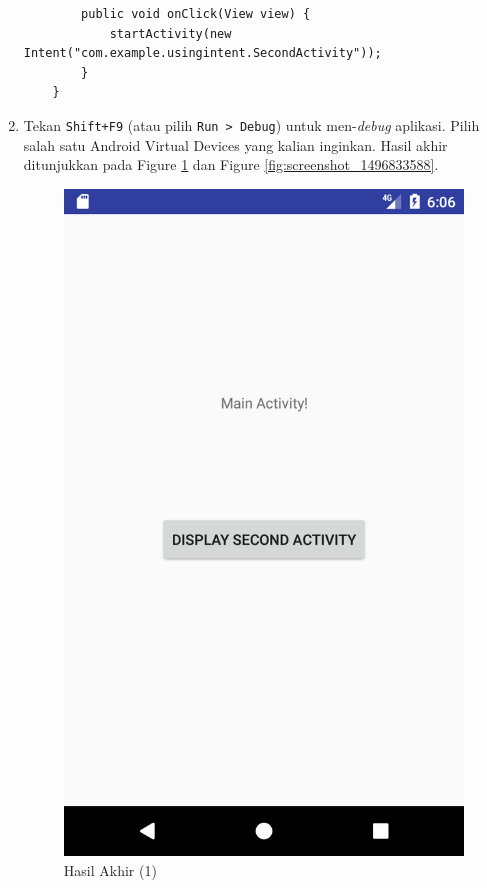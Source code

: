 \documentclass{scrartcl}
\begin{document}
\begin{enumerate}
\begin{verbatim}
		public void onClick(View view) {
			startActivity(new Intent("com.example.usingintent.SecondActivity"));
		}
	}
	\end{verbatim}
	\item Tekan \texttt{Shift+F9} (atau pilih \texttt{Run > Debug}) untuk men-\textit{debug} aplikasi. Pilih salah satu Android Virtual Devices yang kalian inginkan. Hasil akhir ditunjukkan pada Figure \ref{fig:screenshot_1496833584} dan Figure \ref{fig:screenshot_1496833588}.
	
	\begin{figure}[htbp]
	\begin{minipage}{.5\textwidth}
		\centering
		\includegraphics[width=0.7\linewidth]{Screenshot_1496833584}
		\caption{Hasil Akhir (1)}
		\label{fig:screenshot_1496833584}
	\end{minipage}
	\begin{minipage}{.5\textwidth}
		\centering

\end{minipage}
\end{figure}
\end{enumerate}
\end{document}
